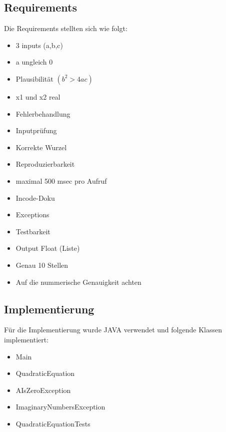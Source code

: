 \documentclass[a4paper,12pt,twoside]{scrreprt}
\begin{document}
\subsection{Requirements}
Die Requirements stellten sich wie folgt:
\begin{itemize}
  \item{3 inputs (a,b,c)}
  \item{a ungleich 0}
  \item{Plausibilität $(b^2 > 4ac)$}
  \item{x1 und x2 real}
  \item{Fehlerbehandlung}
  \item{Inputprüfung}
  \item{Korrekte Wurzel}
  \item{Reproduzierbarkeit}
  \item{maximal 500 msec pro Aufruf}
  \item{Incode-Doku}
  \item{Exceptions}
  \item{Testbarkeit}
  \item{Output Float (Liste)}
  \item{Genau 10 Stellen}
  \item{Auf die nummerische Genauigkeit achten}
\end{itemize}

\subsection{Implementierung}
Für die Implementierung wurde JAVA verwendet und folgende Klassen implementiert:
\begin{itemize}
  \item{Main}
  \item{QuadraticEquation}
  \item{AIsZeroException}
  \item{ImaginaryNumbersException}
  \item{QuadraticEquationTests}
\end{itemize}
\end{document}

